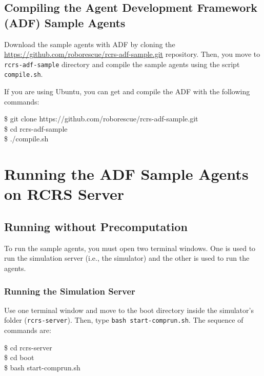 \documentclass{article}
\begin{document}
\subsection{Compiling the Agent Development Framework (ADF) Sample Agents}
Download the sample agents with ADF by cloning the \url{https://github.com/roborescue/rcrs-adf-sample.git} repository. Then, you move to \texttt{rcrs-adf-sample} directory and compile the sample agents using the
script \texttt{compile.sh}.

If you are using Ubuntu, you can get and compile the ADF with the following commands:

\begin{center}
  \begin{tcolorbox}[title=Download ADF on Ubuntu, width=.98\linewidth]
  {\ttfamily\small
  \$ git clone https://github.com/roborescue/rcrs-adf-sample.git\\
  \$ cd rcrs-adf-sample\\
  \$ ./compile.sh
  }
  \end{tcolorbox}
\end{center}
\section{Running the ADF Sample Agents on RCRS Server}
\subsection{Running without Precomputation}
To run the sample agents, you must open two terminal windows. One is used to run the simulation server (i.e., the simulator) and the other is used to run the agents.
\subsubsection{Running the Simulation Server}
Use one terminal window and move to the boot directory inside the simulator's folder (\texttt{rcrs-server}). Then, type \texttt{bash start-comprun.sh}. The sequence of commands are:

\begin{center}
   \begin{tcolorbox}[title=Running Simulation Server, width=.98\linewidth]
    {\ttfamily
    \$ cd rcrs-server\\
    \$ cd boot\\
    \$ bash start-comprun.sh
    }
  \end{tcolorbox}
\end{center}
\end{document}

